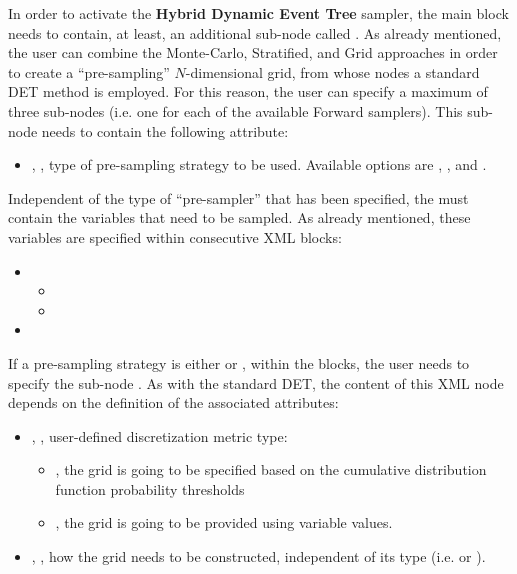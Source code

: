 In order to activate the \textbf{Hybrid Dynamic Event Tree}  sampler, the main
 block needs to contain, at least, an additional
sub-node called .
%
As already mentioned, the user can combine the Monte-Carlo, Stratified, and Grid
approaches in order to create a ``pre-sampling'' $N$-dimensional grid, from
whose nodes a standard DET method is employed.
%
For this reason, the user can specify a maximum of three
 sub-nodes (i.e. one for each of the available
Forward samplers).
%
This sub-node needs to contain the following attribute:
\begin{itemize}
  \item {}, , type of
    pre-sampling strategy to be used.
    Available options are , , and
    .
 \end{itemize}

Independent of the type of ``pre-sampler'' that has been specified, the
 must contain the variables that need to be sampled.
%
As already mentioned, these variables are specified within consecutive
 XML blocks:

\begin{itemize}
  \item \variableDescription
    \variableChildrenIntro
    \begin{itemize}
      \item \distributionDescription
      \item \functionDescription
    \end{itemize}
  \item \constantVariablesDescription
 \end{itemize}

If a pre-sampling strategy  is either  or
, within the  blocks, the user needs to
specify the sub-node .
%
As with the standard DET, the content of this XML node depends on the definition
of the associated attributes:
\begin{itemize}
\itemsep0em
\item {}, , user-defined
  discretization metric type:
  \begin{itemize}
    \item {}, the grid is going to be specified based on the
      cumulative distribution function probability thresholds
    \item {}, the grid is going to be provided using variable
      values.
  \end{itemize}
  \item {}, , how the
    grid needs to be constructed, independent of its type (i.e. 
    or ).
\end{itemize}
\constructionGridDescription

